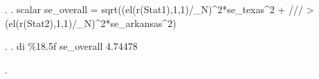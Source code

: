 . 
. scalar se_overall = sqrt((el(r(Stat1),1,1)/_N)^2*se_texas^2 + /// 
>                                          (el(r(Stat2),1,1)/_N)^2*se_arkansas^2)

.                                          
. di \%18.5f se_overall
           4.74478

. 
